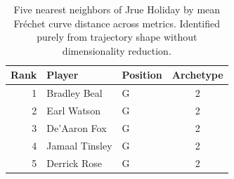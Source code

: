 \begin{table}[htbp]
  \centering\small
  \begin{tabular}{rllc}
    \toprule
    Rank & Player & Position & Archetype \\
    \midrule
    1 & Bradley Beal & G & 2 \\
    2 & Earl Watson & G & 2 \\
    3 & De'Aaron Fox & G & 2 \\
    4 & Jamaal Tinsley & G & 2 \\
    5 & Derrick Rose & G & 2 \\
    \bottomrule
  \end{tabular}
  \caption{Five nearest neighbors of Jrue Holiday by mean Fr\'{e}chet curve distance across metrics. Identified purely from trajectory shape without dimensionality reduction.}
  \label{tab:Jrue_Holiday_frechet_curve_neighbors}
\end{table}

